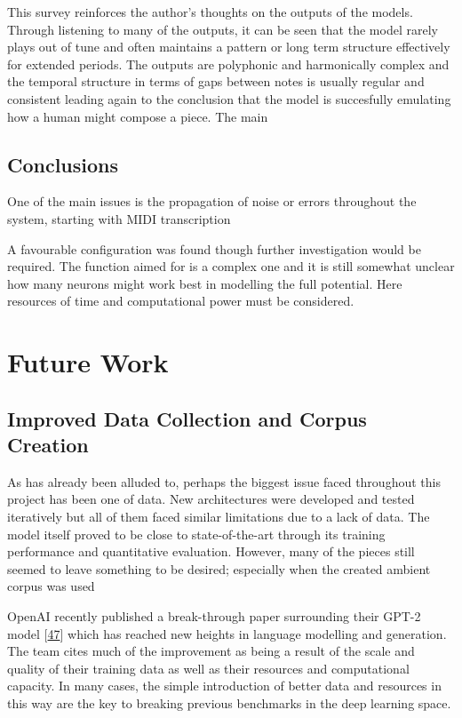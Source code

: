 \documentclass[12pt,]{article}
\begin{document}
This survey reinforces the author's thoughts on the outputs of the
models. Through listening to many of the outputs, it can be seen that
the model rarely plays out of tune and often maintains a pattern or long
term structure effectively for extended periods. The outputs are
polyphonic and harmonically complex and the temporal structure in terms
of gaps between notes is usually regular and consistent leading again to
the conclusion that the model is succesfully emulating how a human might
compose a piece. The main

\hypertarget{conclusions}{%
\subsection{Conclusions}\label{conclusions}}

One of the main issues is the propagation of noise or errors throughout
the system, starting with MIDI transcription

A favourable configuration was found though further investigation would
be required. The function aimed for is a complex one and it is still
somewhat unclear how many neurons might work best in modelling the full
potential. Here resources of time and computational power must be
considered.

\hypertarget{future-work}{%
\section{Future Work}\label{future-work}}

\hypertarget{improved-data-collection-and-corpus-creation}{%
\subsection{Improved Data Collection and Corpus
Creation}\label{improved-data-collection-and-corpus-creation}}

As has already been alluded to, perhaps the biggest issue faced
throughout this project has been one of data. New architectures were
developed and tested iteratively but all of them faced similar
limitations due to a lack of data. The model itself proved to be close
to state-of-the-art through its training performance and quantitative
evaluation. However, many of the pieces still seemed to leave something
to be desired; especially when the created ambient corpus was used

OpenAI recently published a break-through paper surrounding their GPT-2
model {[}\protect\hyperlink{ref-radford2018language}{47}{]} which has
reached new heights in language modelling and generation. The team cites
much of the improvement as being a result of the scale and quality of
their training data as well as their resources and computational
capacity. In many cases, the simple introduction of better data and
resources in this way are the key to breaking previous benchmarks in the
deep learning space.
\end{document}
